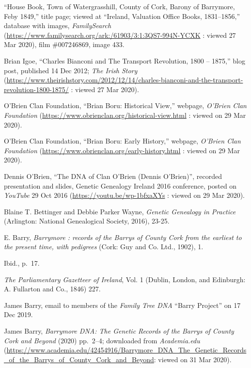 \begin{thebibliography}{99}
	``House Book, Town of Watergrasshill, County of Cork, Barony of Barrymore, Feby 1849,'' title page; viewed at ``Ireland, Valuation Office Books, 1831--1856,'' database with images, \textit{FamilySearch} (\url{https://www.familysearch.org/ark:/61903/3:1:3QS7-994N-YCXK} : viewed 27 Mar 2020), film \#007246869, image 433.
	
	Brian Igoe, ``Charles Bianconi and The Transport Revolution, 1800 -- 1875,'' blog post, published 14 Dec 2012; \textit{The Irish Story} (\url{https://www.theirishstory.com/2012/12/14/charles-bianconi-and-the-transport-revolution-1800-1875/} : viewed 27 Mar 2020).
	
	O'Brien Clan Foundation, ``Brian Boru: Historical View,'' webpage, \textit{O'Brien Clan Foundation} (\url{https://www.obrienclan.org/historical-view.html} : viewed on 29 Mar 2020).
	
	O'Brien Clan Foundation, ``Brian Boru: Early History,'' webpage, \textit{O'Brien Clan Foundation} (\url{https://www.obrienclan.org/early-history.html} : viewed on 29 Mar 2020).	
	
	Dennis O'Brien, ``The DNA of Clan O'Brien (Dennis O'Brien)'', recorded presentation and slides, Genetic Genealogy Ireland 2016 conference, posted on \textit{YouTube} 29 Oct 2016 (\url{https://youtu.be/wp-1bfxaXYs} : viewed on 29 Mar 2020).
	
	Blaine T. Bettinger and Debbie Parker Wayne, \textit{Genetic Genealogy in Practice} (Arlington: National Genealogical Society, 2016), 23-25.
	
	E. Barry, \textit{Barrymore : records of the Barrys of County Cork from the earliest to the present time, with pedigrees} (Cork: Guy and Co. Ltd., 1902), 1.
	
	Ibid., p.\ 17.
	
	\textit{The Parliamentary Gazetteer of Ireland}, Vol. 1 (Dublin, London, and Edinburgh: A. Fullarton and Co., 1846) 227.
	
	James Barry, email to members of the \textit{Family Tree DNA} ``Barry Project'' on 17 Dec 2019.
	
	James Barry, \textit{Barrymore DNA: The Genetic Records of the Barrys of County Cork and Beyond} (2020) pp.\ 2--4; downloaded from \textit{Academia.edu} (\url{https://www.academia.edu/42454916/Barrymore_DNA_The_Genetic_Records_of_the_Barrys_of_County_Cork_and_Beyond}: viewed on 31 Mar 2020).
	

\end{thebibliography}

